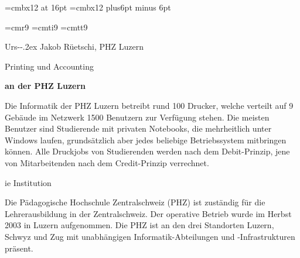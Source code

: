 
\magnification {}
\font\titlefont=cmbx12 at 16pt
\font\sectionfont=cmbx12
\parindent=18pt
\newskip\secskip \secskip=24pt plus6pt minus 6pt
\def\section#1\par{\par\ifdim\lastskip<\secskip
  \removelastskip\penalty-200\vskip\secskip\fi
  \nobreak\medskip\noindent}
\def\\{\hfil\break}
\def\IPP{IP\kern-.2ex P}

\newcount\footno {}
\font\smallrm=cmr9 \font\smallit=cmti9 \font\smalltt=cmtt9
\def\fn#1{\unskip %
  \global\advance\footno by 1%
  $^{\the\footno}$%
  \insert\footins{\raggedright %
  \let\rm=\smallrm \let\it=\smallit \let\tt=\smalltt \rm
  \leftskip=0pt \pretolerance=10000
  \hyphenpenalty=10000 \exhyphenpenalty=10000
  \interlinepenalty=\interfootnotelinepenalty
  \floatingpenalty=20000
  \splittopskip=\ht\strutbox \splitmaxdepth=\dp\strutbox
  \item{$^{\the\footno}$}\strut#1\strut \par\allowbreak}}

\centerline{Urs-\kern-.2ex Jakob R\"uetschi, PHZ Luzern}
\bigskip
\centerline{\titlefont Printing und Accounting}
\smallskip
\centerline{\bf an der PHZ Luzern}
\vskip2pc

\noindent
Die Informatik der PHZ Luzern betreibt rund 100 Drucker,
welche verteilt auf 9 Geb\"aude im Netzwerk 1500 Benutzern
zur Verf\"ugung stehen.
Die meisten Benutzer sind Studierende mit privaten Notebooks,
die mehrheitlich unter Windows laufen, grunds\"atzlich aber jedes
beliebige Betriebssystem mitbringen k\"onnen.
Alle Druckjobs von Studierenden werden nach dem Debit-Prinzip,
jene von Mitarbeitenden nach dem Credit-Prinzip verrechnet.


\section Die Institution

Die P\"adagogische Hochschule Zentralschweiz (PHZ) ist zust\"andig
f\"ur die Lehrerausbildung in der Zentralschweiz. Der operative
Betrieb wurde im Herbst 2003 in Luzern aufgenommen.
Die PHZ ist an den drei Standorten Luzern, Schwyz und Zug mit
unabh\"angigen Informatik-Abteilungen und -Infrastrukturen pr\"asent.

